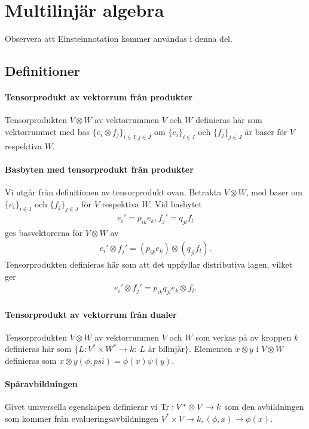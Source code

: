 \section{Multilinjär algebra}

Observera att Einsteinnotation kommer användas i denna del.

\subsection{Definitioner}

\paragraph{Tensorprodukt av vektorrum från produkter}
Tensorprodukten $V\otimes W$ av vektorrummen $V$ och $W$ definieras här som vektorrummet med bas $\{e_{i}\otimes f_{j}\}_{i\in I, j\in J}$ om $\{e_{i}\}_{i\in I}$ och $\{f_{j}\}_{j\in J}$ är baser för $V$ respektiva $W$.

\paragraph{Basbyten med tensorprodukt från produkter}
Vi utgår från definitionen av tensorprodukt ovan. Betrakta $V\otimes W$, med baser om $\{e_{i}\}_{i\in I}$ och $\{f_{j}\}_{j\in J}$ för $V$ respektiva $W$. Vid basbytet
\begin{align*}
	e_{i}' = p_{ik}e_{k}, f_{j}' = q_{jl}f_{l}
\end{align*}
ges basvektorerna för $V\otimes W$ av
\begin{align*}
	e_{i}'\otimes f_{j}' = (p_{ik}e_{k})\otimes (q_{jl}f_{l}).
\end{align*}
Tensorprodukten definieras här som att det uppfyllar distributiva lagen, vilket ger
\begin{align*}
	e_{i}'\otimes f_{j}' = p_{ik}q_{jl}e_{k}\otimes f_{l}.
\end{align*}

\paragraph{Tensorprodukt av vektorrum från dualer}
Tensorprodukten $V\otimes W$ av vektorrummen $V$ och $W$ som verkas på av kroppen $k$ definieras här som $\{L: V^{*}\times W^{*}\to k:\ L\text{ är bilinjär}\}$. Elementen $x\otimes y$ i $V\otimes W$ definieras som $x\otimes y(\phi, psi) = \phi(x)\psi(y)$.

\paragraph{Spåravbildningen}
Givet universella egenskapen definierar vi $\Tr: V^{*}\otimes V\to k$ som den avbildningen som kommer från evalueringsavbildningen $V^{*}\times V\to k, (\phi, x)\to \phi(x)$.

